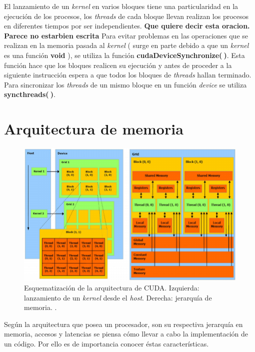 El lanzamiento de un \textit{kernel} en varios bloques tiene una particularidad en la ejecución de los procesos, los \textit{threads} de cada bloque llevan realizan los procesos en diferentes tiempos por ser independientes. \textbf{Que quiere decir esta oracion. Parece no estarbien escrita} Para evitar problemas en las operaciones que se realizan en la memoria pasada al \textit{kernel} ( surge en parte debido a que un \textit{kernel} es una función \textbf{void} ), se utiliza la función \textbf{cudaDeviceSynchronize($\>$)}. Esta función hace que los bloques realicen su ejecución y antes de proceder a la siguiente instrucción espera a que todos los bloques de \textit{threads} hallan terminado. Para sincronizar los \textit{threads} de un mismo bloque en un función \textit{device} se utiliza \textbf{syncthreads($\>$)}.


\section{Arquitectura de memoria}

\begin{figure}[h!]
	\centering
	\includegraphics[width=\textwidth]{figs/cap3/Schematization-of-CUDA-architecture-Schematic-representation-of-CUDA-threads-and-memory.png}
	\caption{Esquematización de la arquitectura de CUDA. Izquierda: lanzamiento de un \textit{kernel} desde el \textit{host}. Derecha: jerarquía de memoria.  \cite{nobile2014cutauleaping}.}
	\label{fig:schedule_architecture_cuda}
\end{figure}

Según la arquitectura que posea un procesador, son su respectiva jerarquía en memoria, accesos y latencias se piensa cómo llevar a cabo la implementación de un código. Por ello es de importancia conocer éstas características. 


